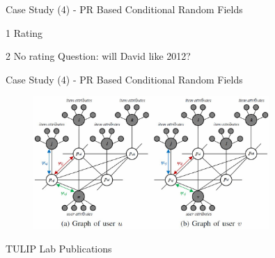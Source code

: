 \documentclass[
 size=14pt,
 paper=smartboard,  %
 mode=present, 		%
 display=slides, 	%
 pauseslide,
 fleqn,leqno]{powerdot}{}
\begin{document}
\begin{slide}{Case Study (4) - PR Based Conditional Random Fields}
\begin{table}[h]
\end{table}

\begin{tablenotes}
	\item[1] Rating
	\item[2] No rating Question: will David like 2012?
\end{tablenotes}
\end{slide}


\begin{slide}[toc=,bm=]{Case Study (4) - PR Based Conditional Random Fields}

\begin{figure}
	\includegraphics[width=0.8\textwidth]{figures//theme3//Theme3_5_1.eps}
\end{figure}

\def\bibfont\footnotesize


\end{slide}

\begin{slide}[toc=,bm=]{TULIP Lab Publications}


\end{slide}
\end{document}
